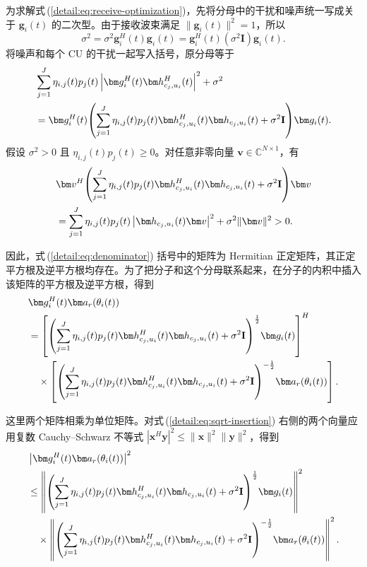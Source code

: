为求解式\,(\ref{detail:eq:receive-optimization})，先将分母中的干扰和噪声统一写成关于 $\bm g_i(t)$ 的二次型。由于接收波束满足 $\|\bm g_i(t)\|^2=1$，所以
\begin{equation}
\sigma^2=\sigma^2\bm g_i^H(t)\bm g_i(t)
=\bm g_i^H(t)(\sigma^2\mathbf I)\bm g_i(t).
\end{equation}
将噪声和每个 CU 的干扰一起写入括号，原分母等于
\begin{align}\label{detail:eq:denominator}
&\sum_{j=1}^J\eta_{i,j}(t)p_j(t)
\left|\bm g_i^H(t)\bm h_{c_j,u_i}^{H}(t)\right|^2+\sigma^2\notag\\
&=\bm g_i^H(t)\!\left(\sum_{j=1}^J\eta_{i,j}(t)p_j(t)
\bm h_{c_j,u_i}^{H}(t)\bm h_{c_j,u_i}(t)+\sigma^2\mathbf I\right)\!\bm g_i(t).
\end{align}
假设 $\sigma^2>0$ 且 $\eta_{i,j}(t)p_j(t)\ge0$。对任意非零向量 $\bm v\in\mathbb C^{N\times1}$，有
\begin{align}
&\bm v^H\!\left(\sum_{j=1}^J\eta_{i,j}(t)p_j(t)
\bm h_{c_j,u_i}^{H}(t)\bm h_{c_j,u_i}(t)+\sigma^2\mathbf I\right)\!\bm v\notag\\
&=\sum_{j=1}^J\eta_{i,j}(t)p_j(t)
\left|\bm h_{c_j,u_i}(t)\bm v\right|^2+\sigma^2\|\bm v\|^2>0.
\end{align}
\begin{samepage}
因此，式\,(\ref{detail:eq:denominator}) 括号中的矩阵为 Hermitian 正定矩阵，其正定平方根及逆平方根均存在。为了把分子和这个分母联系起来，在分子的内积中插入该矩阵的平方根及逆平方根，得到
\begin{align}\label{detail:eq:sqrt-insertion}
&\bm g_i^H(t)\bm a_r(\theta_i(t))\notag\\
&=\left[\left(\sum_{j=1}^J\eta_{i,j}(t)p_j(t)
\bm h_{c_j,u_i}^{H}(t)\bm h_{c_j,u_i}(t)+\sigma^2\mathbf I\right)^{\frac12}\!\bm g_i(t)\right]^H\notag\\
&\quad\times\left[\left(\sum_{j=1}^J\eta_{i,j}(t)p_j(t)
\bm h_{c_j,u_i}^{H}(t)\bm h_{c_j,u_i}(t)+\sigma^2\mathbf I\right)^{-\frac12}\!\bm a_r(\theta_i(t))\right].
\end{align}
\end{samepage}
\begin{samepage}
这里两个矩阵相乘为单位矩阵。对式\,(\ref{detail:eq:sqrt-insertion}) 右侧的两个向量应用复数 Cauchy--Schwarz 不等式 $|\bm x^H\bm y|^2\le\|\bm x\|^2\|\bm y\|^2$，得到
\begin{align}\label{detail:eq:cs-norms}
&\left|\bm g_i^H(t)\bm a_r(\theta_i(t))\right|^2\notag\\
&\le\left\|\left(\sum_{j=1}^J\eta_{i,j}(t)p_j(t)
\bm h_{c_j,u_i}^{H}(t)\bm h_{c_j,u_i}(t)+\sigma^2\mathbf I\right)^{\frac12}\!\bm g_i(t)\right\|^2\notag\\
&\quad\times\left\|\left(\sum_{j=1}^J\eta_{i,j}(t)p_j(t)
\bm h_{c_j,u_i}^{H}(t)\bm h_{c_j,u_i}(t)+\sigma^2\mathbf I\right)^{-\frac12}\!\bm a_r(\theta_i(t))\right\|^2.
\end{align}
\end{samepage}
